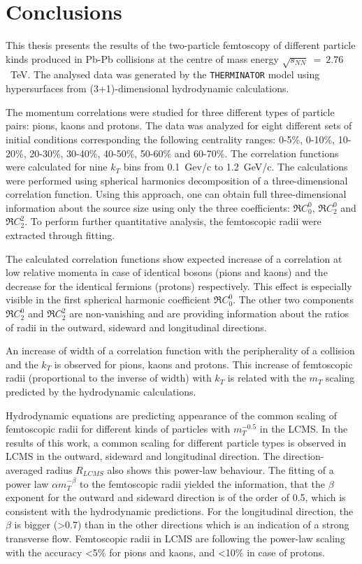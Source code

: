 \chapter*{Conclusions}
  This thesis presents the results of the two-particle femtoscopy of different particle kinds produced in Pb-Pb collisions at the centre of mass energy $\sqrt{s_{NN}}~=~2.76$~TeV.
  The analysed data was generated by the \verb|THERMINATOR| model using hypersurfaces from (3+1)-dimensional hydrodynamic calculations.

  The momentum correlations were studied for three different types of particle pairs: pions, kaons and protons.
  The data was analyzed for eight different sets of initial conditions corresponding the following centrality ranges: 0-5\%, 0-10\%, 10-20\%, 20-30\%, 30-40\%, 40-50\%, 50-60\% and 60-70\%.
  The correlation functions were calculated for nine $k_T$ bins from 0.1~Gev/c to 1.2~GeV/c.
  The calculations were performed using spherical harmonics decomposition of a three-dimensional correlation function.
  Using this approach, one can obtain full three-dimensional information about the source size using only the three coefficients: $\Re C^0_0$, $\Re C^0_2$ and $\Re C^2_2$.
  To perform further quantitative analysis, the femtoscopic radii were extracted through fitting.

  The calculated correlation functions show expected increase of a correlation at low relative momenta in case of identical bosons (pions and kaons) and the decrease for the identical fermions (protons) respectively.
  This effect is especially visible in the first spherical harmonic coefficient $\Re C^0_0$.
  The other two components $\Re C^0_2$ and $\Re C^2_2$ are non-vanishing and are providing information about the ratios of radii in the outward, sideward and longitudinal directions.

  An increase of width of a correlation function with the peripherality of a collision and the $k_T$ is observed for pions, kaons and protons.
  This increase of femtoscopic radii (proportional to the inverse of width) with $k_T$ is related with the $m_T$ scaling predicted by the hydrodynamic calculations.

  Hydrodynamic equations are predicting appearance of the common scaling of femtoscopic radii for different kinds of particles with $m_T^{-0.5}$ in the LCMS.
  In the results of this work, a common scaling for different particle types is observed in LCMS in the outward, sideward and longitudinal direction.
  The direction-averaged radius $R_{LCMS}$ also shows this power-law behaviour.
  The fitting of a power law $\alpha m_T^{-\beta}$ to the femtoscopic radii yielded the information, that the $\beta$ exponent for the outward and sideward direction is of the order of 0.5, which is consistent with the hydrodynamic predictions.
  For the longitudinal direction, the $\beta$ is bigger (>0.7) than in the other directions which is an indication of a strong transverse flow.
  Femtoscopic radii in LCMS are following the power-law scaling with the accuracy <5\% for pions and kaons, and <10\% in case of protons.
  
